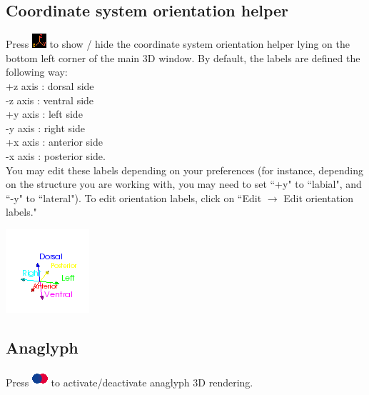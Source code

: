 \subsection{Coordinate system orientation helper}
\begin{minipage}{0.7\textwidth}
Press \includegraphics[scale=0.7]{images/06/other/orientation_helper.png} to show / hide the coordinate system orientation helper lying on the bottom left corner of the main 3D window. By default, the labels are defined
the following way:\\
+z axis : dorsal side\\
-z axis : ventral side\\
+y axis : left side\\
-y axis : right side\\
+x axis : anterior side\\
-x axis : posterior side.\\
You may edit these labels depending on your preferences (for instance,
depending on the structure you are working with, you may need to set ``+y" to ``labial", and ``-y" to
``lateral"). To edit orientation labels, click on ``Edit $\rightarrow$ Edit orientation labels."
\end{minipage}    
\begin{minipage}{0.3\textwidth}\centering
 \includegraphics[scale=0.7]{images/06/camera/orientation_helper_view.png}
 \end{minipage}   


\subsection{Anaglyph}
Press \includegraphics[scale=0.7]{images/06/other/anaglyph.png} to activate/deactivate anaglyph 3D rendering.


